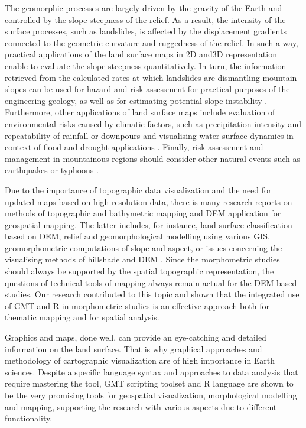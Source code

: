 \documentclass[land,article,submit,pdftex,moreauthors]{Definitions/mdpi}
\begin{document}
The geomorphic processes are largely driven by the gravity of the Earth and controlled by the slope steepness of the relief. As a result, the intensity of the surface processes, such as landslides, is affected by the displacement gradients connected to the geometric curvature and ruggedness of the relief. In such a way, practical applications of the land surface maps in 2D and3D representation enable to evaluate the slope steepness quantitatively. In turn, the information retrieved from the calculated rates at which landslides are dismantling mountain slopes can be used for hazard and risk assessment for practical purposes of the engineering geology, as well as for estimating potential slope instability \cite{FUJISAWA2010150}. Furthermore, other applications of land surface maps include evaluation of environmental risks caused by climatic factors, such as precipitation intensity and repeatability of rainfall or downpours \cite{Tsunetaka,Oku} and visualising water surface dynamics in context of flood and drought applications \cite{rs14102475}. Finally, risk assessment and management in mountainous regions should consider other natural events such as earthquakes or typhoons \cite{Yamada,Wangetal2010,HIRATA2019105217}. 

Due to the importance of topographic data visualization and the need for updated maps based on high resolution data, there is many research reports on methods of topographic and bathymetric mapping and DEM application for geospatial mapping. The latter includes, for instance, land surface classification based on DEM, relief and geomorphological modelling using various GIS, geomorphometric computations of slope and aspect, or issues concerning the visualising methods of hillshade and DEM \cite{PRIMA2006373,LIN2004159,HAYAKAWA200690}. Since the morphometric studies should always be supported by the spatial topographic representation, the questions of technical tools of mapping always remain actual for the DEM-based studies. Our research contributed to this topic and shown that the integrated use of GMT and R in morphometric studies is an effective approach both for thematic mapping and for spatial analysis. 

Graphics and maps, done well, can provide an eye-catching and detailed information on the land surface. That is why graphical approaches and methodology of cartographic visualization are of high importance in Earth sciences. Despite a specific language syntax and approaches to data analysis that require mastering the tool, GMT scripting toolset and R language are shown to be the very promising tools for geospatial visualization, morphological modelling and mapping, supporting the research with various aspects due to different functionality. 
\end{document}

